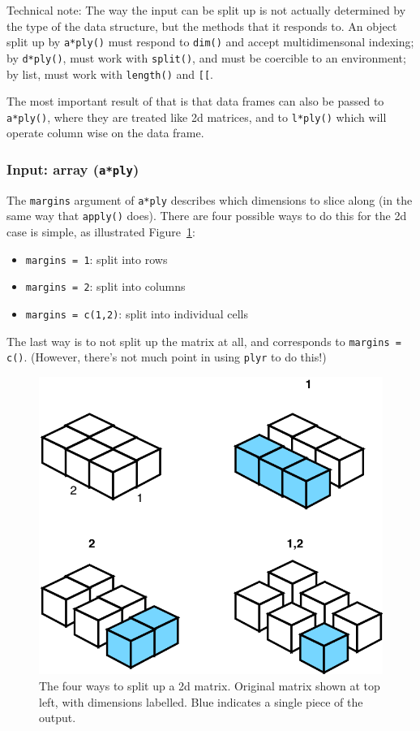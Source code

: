 \documentclass[letterpaper,oneside]{scrartcl}
\newcommand{\code}[1]{\lstinline!#1!}
\newcommand{\f}[1]{\lstinline!#1()!}
\begin{document}
Technical note: The way the input can be split up is not actually determined by the type of the data structure, but the methods that it responds to.  An object split up by \f{a*ply} must respond to \f{dim} and accept multidimensonal indexing; by \f{d*ply}, must work with \f{split}, and must be coercible to an environment; by list, must work with \f{length} and \code{[[}.

The most important result of that is that data frames can also be passed to \f{a*ply}, where they are treated like 2d matrices, and to \f{l*ply} which will operate column wise on the data frame.

\subsubsection{Input: array ({\tt a*ply})}

The {\tt margins} argument of {\tt a*ply} describes which dimensions to slice along (in the same way that \f{apply} does).  There are four possible ways to do this for the 2d case is simple, as illustrated Figure~\ref{fig:split-matrix}:

\begin{itemize}
  \item \code{margins = 1}: split into rows
  \item \code{margins = 2}: split into columns
  \item \code{margins = c(1,2)}: split into individual cells
\end{itemize}

\noindent The last way is to not split up the matrix at all, and corresponds to \code{margins = c()}.  (However, there's not much point in using {\tt plyr} to do this!)

\begin{figure}[htbp]
  \centering
    \includegraphics[width= 0.35 \textwidth]{split-matrix}
  \caption{The four ways to split up a 2d matrix.  Original matrix shown at top left, with dimensions labelled.  Blue indicates a single piece of the output.}
  \label{fig:split-matrix}
\end{figure}
\end{document}
